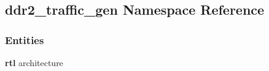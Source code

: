 \subsection{ddr2\+\_\+traffic\+\_\+gen Namespace Reference}
\label{namespaceddr2__traffic__gen}
\subsubsection*{Entities}
\begin{DoxyCompactItemize}
\item 
{\bf rtl} architecture
\end{DoxyCompactItemize}
